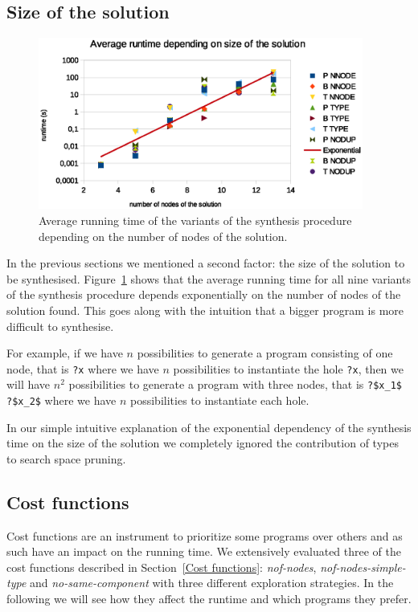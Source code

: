 \subsection{Size of the solution}
\begin{figure}[p]
    \centering
    \includegraphics[width=0.95\textwidth]{time_vs_nof_nodes.eps}
    \caption{Average running time of the variants of the synthesis procedure depending on the number of nodes of the solution.}
    \label{fig:runtime_vs_nof_nodes}
\end{figure}
In the previous sections we mentioned a second factor: the size of the solution to be synthesised. Figure~\ref{fig:runtime_vs_nof_nodes} shows that the average running time for all nine variants of the synthesis procedure depends exponentially on the number of nodes of the solution found. This goes along with the intuition that a bigger program is more difficult to synthesise.

For example, if we have $n$ possibilities to generate a program consisting of one node, that is \lstinline!?x! where we have $n$ possibilities to instantiate the hole \lstinline!?x!, then we will have $n^2$ possibilities to generate a program with three nodes, that is \lstinline!?$x_1$ ?$x_2$! where we have $n$ possibilities to instantiate each hole.




In our simple intuitive explanation of the exponential dependency of the synthesis time on the size of the solution we completely ignored the contribution of types to search space pruning.

\subsection{Cost functions}
Cost functions are an instrument to prioritize some programs over others and as such have an impact on the running time. We extensively evaluated three of the cost functions described in Section~\ref{Cost functions}: \textit{nof-nodes}, \textit{nof-nodes-simple-type} and \textit{no-same-component} with three different exploration strategies. In the following we will see how they affect the runtime and which programs they prefer.

